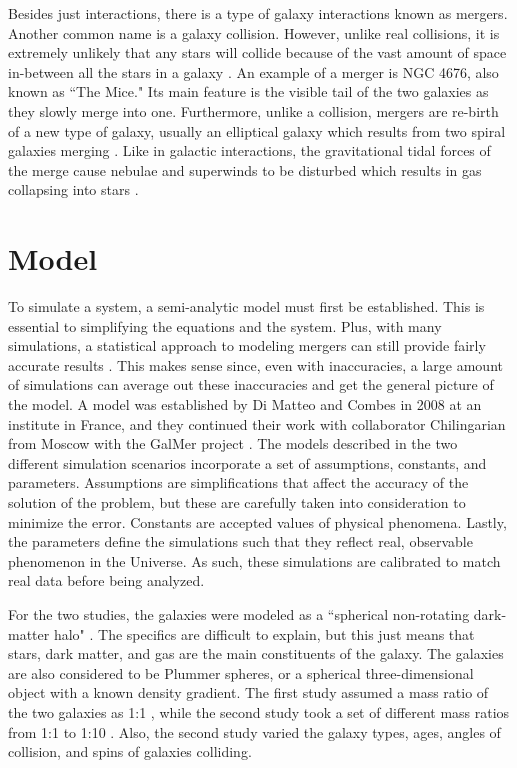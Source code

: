 \documentclass[11pt]{article} %
\begin{document}
	Besides just interactions, there is a type of galaxy interactions known as mergers. Another common name is a galaxy collision. However, unlike real collisions, it is extremely unlikely that any stars will collide because of the vast amount of space in-between all the stars in a galaxy \cite{andromeda}. An example of a merger is NGC 4676, also known as ``The Mice." Its main feature is the visible tail of the two galaxies as they slowly merge into one. Furthermore, unlike a collision, mergers are re-birth of a new type of galaxy, usually an elliptical galaxy which results from two spiral galaxies merging \cite{andromeda}. Like in galactic interactions, the gravitational tidal forces of the merge cause nebulae and superwinds to be disturbed which results in gas collapsing into stars \cite{knol}.


\section{Model}
	To simulate a system, a semi-analytic model must first be established. This is essential to simplifying the equations and the system. Plus, with many simulations, a statistical approach to modeling mergers can still provide fairly accurate results \cite{mergerstats}. This makes sense since, even with inaccuracies, a large amount of simulations can average out these inaccuracies and get the general picture of the model. A model was established by Di Matteo and Combes in 2008 at an institute in France, and they continued their work with collaborator Chilingarian from Moscow with the GalMer project \cite{mergers,mergerstats}. The models described in the two different simulation scenarios incorporate a set of assumptions, constants, and parameters. Assumptions are simplifications that affect the accuracy of the solution of the problem, but these are carefully taken into consideration to minimize the error. Constants are accepted values of physical phenomena. Lastly, the parameters define the simulations such that they reflect real, observable phenomenon in the Universe. As such, these simulations are calibrated to match real data before being analyzed.

	For the two studies, the galaxies were modeled as a ``spherical non-rotating dark-matter halo" \cite{mergers}. The specifics are difficult to explain, but this just means that stars, dark matter, and gas are the main constituents of the galaxy. The galaxies are also considered to be Plummer spheres, or a spherical three-dimensional object with a known density gradient. The first study assumed a mass ratio of the two galaxies as 1:1 \cite{mergerstats}, while the second study took a set of different mass ratios from 1:1 to 1:10 \cite{mergers}. Also, the second study varied the galaxy types, ages, angles of collision, and spins of galaxies colliding.
\end{document}
